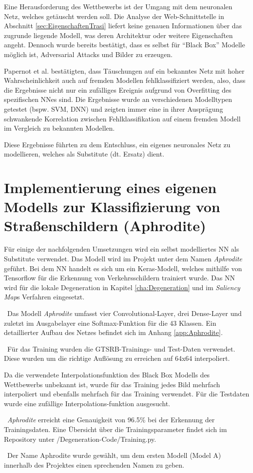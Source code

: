 \label{sec:TrasiModell}
Eine Herausforderung des Wettbewerbs ist der Umgang mit dem neuronalen Netz, welches getäuscht werden soll. Die Analyse der Web-Schnittstelle in Abschnitt \ref{sec:EigenschaftenTrasi} liefert keine genauen Informationen über das zugrunde liegende Modell, was deren Architektur oder weitere Eigenschaften angeht. Dennoch wurde bereits bestätigt, dass es selbst für "`Black Box"' Modelle möglich ist, Adversarial Attacks und Bilder zu erzeugen.


Papernot et al. \cite{papernot_+_2016} bestätigten, dass Täuschungen auf ein bekanntes Netz mit hoher Wahrscheinlichkeit auch auf fremden Modellen fehlklassifiziert werden, also, dass die Ergebnisse nicht nur ein zufälliges Ereignis aufgrund von Overfitting des spezifischen \acl{NN}es sind. Die Ergebnisse wurde an verschiedenen Modelltypen getestet (bspw. \ac{SVM}, \ac{DNN}) und zeigten immer eine in ihrer Ausprägung schwankende Korrelation zwischen Fehlklassifikation auf einem fremden Modell im Vergleich zu bekannten Modellen. 


Diese Ergebnisse führten zu dem Entschluss, ein eigenes neuronales Netz zu modellieren, welches als Substitute (dt. Ersatz) dient.


\section{Implementierung eines eigenen Modells zur Klassifizierung von Straßenschildern (Aphrodite)}
\label{sec:ImplAphrodite}
Für einige der nachfolgenden Umsetzungen wird ein selbst modelliertes \ac{NN} als Substitute verwendet. Das Modell wird im Projekt unter dem Namen \textit{Aphrodite} geführt. Bei dem \ac{NN} handelt es sich um ein Keras-Modell, welches mithilfe von Tensorflow für die Erkennung von Verkehrsschildern trainiert wurde. Das \ac{NN} wird für die lokale Degeneration in Kapitel \ref{cha:Degeneration} und im \textit{Saliency Map}s Verfahren eingesetzt.

~\newline Das Modell \textit{Aphrodite} umfasst vier Convolutional-Layer, drei Dense-Layer und zuletzt im Ausgabelayer eine Softmax-Funktion für die 43 Klassen. Ein detaillierter Aufbau des Netzes befindet sich im Anhang \ref{app:Aphrodite}.

~\newline Für das Training wurden die \ac{GTSRB}-Trainings- und Test-Daten verwendet. Diese wurden um die richtige Auflösung zu erreichen auf 64x64 interpoliert. 

Da die verwendete Interpolationsfunktion des Black Box Modells des Wettbewerbs unbekannt ist, wurde für das Training jedes Bild mehrfach interpoliert und ebenfalls mehrfach für das Training verwendet. Für die Testdaten wurde eine zufällige Interpolations-funktion ausgesucht. 

~\newline \textit{Aphrodite} erreicht eine Genauigkeit von 96.5\% bei der Erkennung der Trainingsdaten. Eine Übersicht über die Trainingsparameter findet sich im Repository unter /Degeneration-Code/Training.py. 

~\newline Der Name Aphrodite wurde gewählt, um dem ersten Modell (Model A) innerhalb des Projektes einen sprechenden Namen zu geben.
